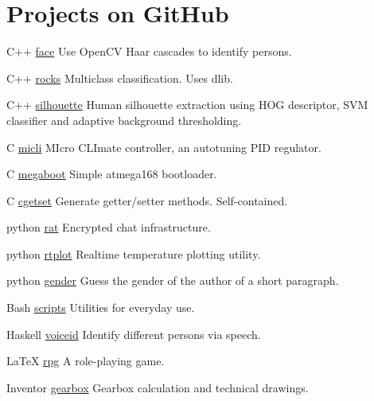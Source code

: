 \documentclass{tccv}
\begin{document}
\section{Projects on GitHub}
\begin{yearlist}
\item{C++}
     {\href{https://github.com/MiroslavVitkov/face}{face}}
     {Use OpenCV Haar cascades to identify persons. }

\item{C++}
     {\href{https://github.com/MiroslavVitkov/rocks}{rocks}}
     {Multiclass classification. Uses dlib.}

\item{C++}
     {\href{https://github.com/MiroslavVitkov/silhouette}{silhouette}}
     {Human silhouette extraction using HOG descriptor, SVM classifier and adaptive background thresholding.}

\item{C}
     {\href{https://github.com/MiroslavVitkov/micli}{micli}}
     {MIcro CLImate controller, an autotuning PID regulator.}

\item{C}
     {\href{https://github.com/MiroslavVitkov/megaboot}{megaboot}}
     {Simple atmega168 bootloader.}


\item{C}
     {\href{https://github.com/MiroslavVitkov/cgetset}{cgetset}}
     {Generate getter/setter methods. Self-contained.}

\item{python}
     {\href{https://github.com/MiroslavVitkov/rat}{rat}}
     {Encrypted chat infrastructure.}


\item{python}
     {\href{https://github.com/MiroslavVitkov/rtplot}{rtplot}}
     {Realtime temperature plotting utility.}


\item{python}
     {\href{https://github.com/MiroslavVitkov/gender}{gender}}
     {Guess the gender of the author of a short paragraph.}


\item{Bash}
     {\href{https://github.com/MiroslavVitkov/scripts}{scripts}}
     {Utilities for everyday use.}


\item{Haskell}
     {\href{https://github.com/MiroslavVitkov/voiceid}{voiceid}}
     {Identify different persons via speech.}


\item{LaTeX}
     {\href{https://github.com/MiroslavVitkov/rpg}{rpg}}
     {A role-playing game.}


\item{Inventor}
     {\href{https://github.com/MiroslavVitkov/gearbox}{gearbox}}
     {Gearbox calculation and technical drawings.}
\end{yearlist}
\end{document}
